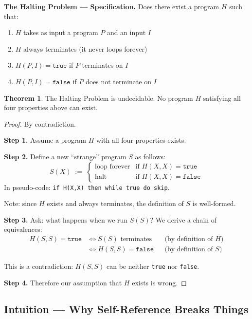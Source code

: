 \documentclass[11pt, a4paper]{article}
\theoremstyle{definition}
\newtheorem{theorem}{Theorem}[section]
\theoremstyle{remark}
\begin{document}
\begin{defbox}
\textbf{The Halting Problem --- Specification.}
Does there exist a program $H$ such that:
\begin{enumerate}[itemsep=2pt]
  \item $H$ takes as input a program $P$ and an input $I$
  \item $H$ always terminates (it never loops forever)
  \item $H(P,I)=\texttt{true}$ if $P$ terminates on $I$
  \item $H(P,I)=\texttt{false}$ if $P$ does not terminate on $I$
\end{enumerate}
\end{defbox}

\begin{theorem}
The Halting Problem is undecidable.  No program $H$ satisfying all four properties above
can exist.
\end{theorem}

\begin{proof}
By contradiction.

\textbf{Step 1.}  Assume a program $H$ with all four properties exists.

\textbf{Step 2.}  Define a new ``strange'' program $S$ as follows:
\[
  S(X)\;:=\;
  \begin{cases}
    \text{loop forever} & \text{if }H(X,X)=\texttt{true} \\
    \text{halt}         & \text{if }H(X,X)=\texttt{false}
  \end{cases}
\]
In pseudo-code: \texttt{if H(X,X) then while true do skip}.

Note: since $H$ exists and always terminates, the definition of $S$ is well-formed.

\textbf{Step 3.}  Ask: what happens when we run $S(S)$?  We derive a chain of equivalences:
\begin{align*}
  H(S,S)=\texttt{true}
  &\iff S(S)\text{ terminates}  &&\text{(by definition of }H\text{)} \\
  &\iff H(S,S)=\texttt{false}  &&\text{(by definition of }S\text{)}
\end{align*}

This is a contradiction: $H(S,S)$ can be neither \texttt{true} nor \texttt{false}.

\textbf{Step 4.}  Therefore our assumption that $H$ exists is wrong.
\end{proof}

\subsection{Intuition --- Why Self-Reference Breaks Things}
\end{document}
